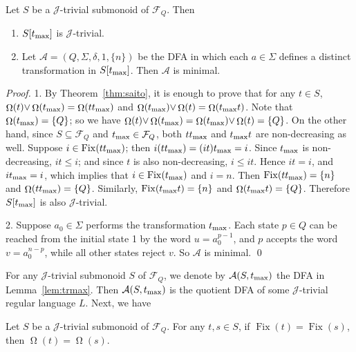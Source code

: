 \documentclass{llncs}
\renewcommand{\le}{\leqslant}
\newcommand{\Sig}{\Sigma}
\newcommand{\be}{\begin{enumerate}}
\newcommand{\ee}{\end{enumerate}}
\newcommand{\cA}{{\mathcal A}}
\newcommand{\cF}{{\mathcal F}}
\newcommand{\gJ}{{\mathcal J}}
\newcommand{\join}{{\mathbin{\vee}}}
\DeclareMathOperator{\Fix}{Fix}
\DeclareMathOperator{\Orbit}{\Omega}
\begin{document}
\begin{lemma}\label{lem:trmax} 
Let $S$ be a $\gJ$-trivial submonoid of $\cF_Q$. Then
\be 
\item 
$S[{t_{\mathrm{max}}}]$ is $\gJ$-trivial.
\item 
Let $\cA = (Q, \Sig, \delta, 1, \{n\})$ be the DFA in which each $a \in \Sig$ defines a distinct transformation in $S[{t_{\mathrm{max}}}]$. Then $\cA$ is minimal. 
\ee 
\end{lemma}

\begin{proof}
1. By Theorem~\ref{thm:saito}, it is enough to prove that for any $t \in S$, $\Orbit(t) \join \Orbit(\trmax) = \Orbit(t \trmax)$ and $\Orbit(\trmax) \join \Orbit(t) = \Orbit(\trmax t)$. Note that $\Orbit(\trmax) = \{Q\}$; so we have $\Orbit(t) \join \Orbit(\trmax) = \Orbit(\trmax) \join \Orbit(t) = \{Q\}$. On the other hand, since $S \subseteq \cF_Q$ and $\trmax \in \cF_Q$, both $t {t_{\mathrm{max}}}$ and ${t_{\mathrm{max}}} t$ are non-decreasing as well. Suppose $i \in \Fix(t \trmax)$; then $i(t {t_{\mathrm{max}}}) = (it){t_{\mathrm{max}}} = i$. Since ${t_{\mathrm{max}}}$ is non-decreasing, $it \le i$; and since $t$ is also non-decreasing, $i \le it$. Hence $it = i$, and $i {t_{\mathrm{max}}} = i$, which implies that $i \in \Fix(\trmax)$ and $i = n$. Then $\Fix(t \trmax) = \{n\}$ and $\Orbit(t \trmax) = \{Q\}$. Similarly, $\Fix(\trmax t) = \{n\}$ and $\Orbit(\trmax t) = \{Q\}$. Therefore $S[{t_{\mathrm{max}}}]$ is also $\gJ$-trivial. 


2. Suppose $a_0 \in \Sig$ performs the transformation ${t_{\mathrm{max}}}$. Each state $p \in Q$ can be reached from the initial state 1 by the word $u = a_0^{p-1}$, and $p$ accepts the word $v = a_0^{n-p}$, while all other states reject $v$. So $\cA$ is minimal. \qed
\end{proof}


For any $\gJ$-trivial submonoid $S$ of $\cF_Q$, we denote by $\cA(S, \trmax)$ the DFA in Lemma~\ref{lem:trmax}. Then $\cA(S, \trmax)$ is the quotient DFA of some $\gJ$-trivial regular language $L$. Next, we have

\begin{lemma}\label{lem:orbitfix} 
Let $S$ be a $\gJ$-trivial submonoid of $\cF_Q$. For any $t, s \in S$, 
if $\Fix(t) = \Fix(s)$, then $\Orbit(t) = \Orbit(s)$. 
\end{lemma}
\end{document}
